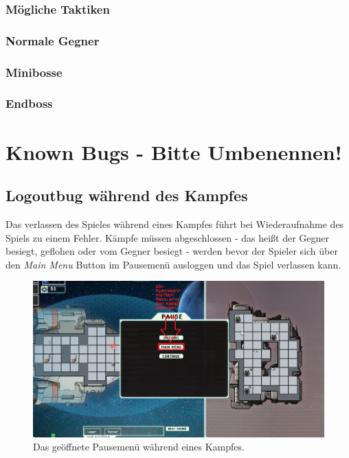 \documentclass[fontsize=12pt,paper=a4,twoside]{scrartcl}
\begin{document}
\subsubsection{Mögliche Taktiken}

\subsubsection{Normale Gegner}

\subsubsection{Minibosse}

\subsubsection{Endboss}

\newpage
\section{Known Bugs - Bitte Umbenennen!}

\subsection{Logoutbug während des Kampfes}

Das verlassen des Spieles während eines Kampfes führt bei Wiederaufnahme des Spiels zu einem Fehler. Kämpfe müssen abgeschlossen - das heißt der Gegner besiegt, geflohen oder vom Gegner besiegt - werden bevor der Spieler sich über den \textit{Main Menu} Button im Pausemenü ausloggen und das Spiel verlassen kann.

\begin{figure}[H]
\centering
\includegraphics[width=0.8\linewidth]{DasSpiel/known Bugs/Battle-Option-Logout.png}
\caption{Das geöffnete Pausemenü während eines Kampfes.}
\end{figure} 
\end{document}

